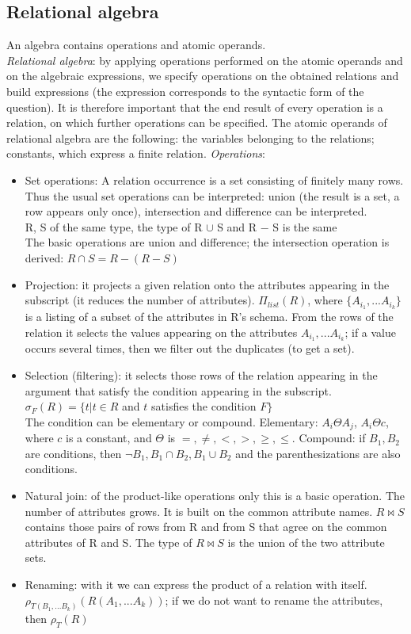 \documentclass[margin=0px]{article}
\begin{document}
\subsection{Relational algebra}

An algebra contains operations and atomic operands. \\
\textit{Relational algebra}: by applying operations performed on the atomic operands and on the algebraic expressions, we specify operations on the obtained relations and build expressions (the expression corresponds to the syntactic form of the question). It is therefore important that the end result of every operation is a relation, on which further operations can be specified. The atomic operands of relational algebra are the following: the variables belonging to the relations; constants, which express a finite relation.
\textit{Operations}:
\begin{itemize}
    \item Set operations: A relation occurrence is a set consisting of finitely many rows. Thus the usual set operations can be interpreted: union (the result is a set, a row appears only once), intersection and difference can be interpreted. \\
          R, S of the same type, the type of R $\cup$ S and R $-$ S is the same \\
          The basic operations are union and difference; the intersection operation is derived: $R \cap S = R - (R - S)$
    \item Projection: it projects a given relation onto the attributes appearing in the subscript (it reduces the number of attributes). $\Pi_{list}(R)$, where $\{A_{i_1},...A_{i_k}\}$ is a listing of a subset of the attributes in R's schema. From the rows of the relation it selects the values appearing on the attributes $A_{i_1},...A_{i_k}$; if a value occurs several times, then we filter out the duplicates (to get a set).
    \item Selection (filtering): it selects those rows of the relation appearing in the argument that satisfy the condition appearing in the subscript. $\sigma_F(R) = \{t|t \in R$ and $t$ satisfies the condition $F\}$ \\
          The condition can be elementary or compound. Elementary: $A_i \Theta A_j$, $A_i \Theta c$, where $c$ is a constant, and $\Theta$ is $=, \neq, <, >, \geq, \leq$. Compound: if $B_1, B_2$ are conditions, then $\neg B_1, B_1 \cap B_2, B_1 \cup B_2$ and the parenthesizations are also conditions.
    \item Natural join: of the product-like operations only this is a basic operation. The number of attributes grows. It is built on the common attribute names. $R \bowtie S$ contains those pairs of rows from R and from S that agree on the common attributes of R and S. The type of $R \bowtie S$ is the union of the two attribute sets.
    \item Renaming: with it we can express the product of a relation with itself. $\rho_{T(B_1,...B_k)}(R(A_1,...A_k))$; if we do not want to rename the attributes, then $\rho_{T}(R)$
\end{itemize}
\end{document}
